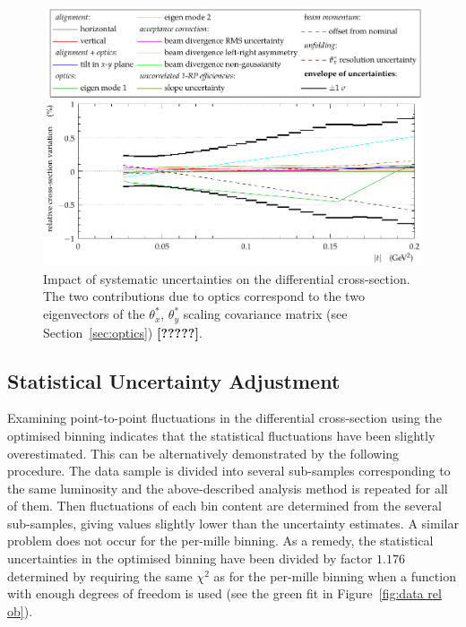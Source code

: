 \begin{figure}[t]
\begin{center}
\includegraphics[width=\textwidth]{fig/direct_method_mode_cmp_presentation.pdf}
\caption{%
Impact of systematic uncertainties on the differential cross-section. The two contributions due to optics correspond to the two eigenvectors of the $\theta_x^*$, $\theta_y^*$ scaling covariance matrix (see Section~\ref{sec:optics}) \textbf{[?????]}.
}
\label{fig:syst unc}
\end{center}
\end{figure}


\subsection{Statistical Uncertainty Adjustment}
\label{sec:stat unc adj}
%
Examining point-to-point fluctuations in the differential cross-section using the optimised binning indicates that the statistical fluctuations have been slightly overestimated. This can be alternatively demonstrated by the following procedure. The data sample is divided into several sub-samples corresponding to the same luminosity and the above-described analysis method is repeated for all of them. Then fluctuations of each bin content are determined from the several sub-samples, giving values slightly lower than the uncertainty estimates. A similar problem does not occur for the per-mille binning.
As a remedy, the statistical uncertainties in the optimised binning have been divided by factor $1.176$ determined by requiring the same $\chi^2$ as for the per-mille binning when a function with enough degrees of freedom is used (see the green fit in Figure~\ref{fig:data rel ob}).


